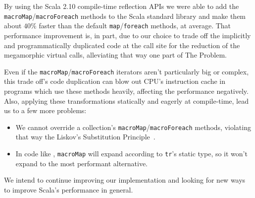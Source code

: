 \label{conclusions}

By using the Scala 2.10 compile-time reflection APIs we were able to add the \texttt{macroMap}/\texttt{macroForeach} methods to the Scala standard library and make them about $40\%$ faster than the default \texttt{map}/\texttt{foreach} methods, at average. That performance improvement is, in part, due to our choice to trade off the implicitly and programmatically duplicated code at the call site for the reduction of the megamorphic virtual calls, alleviating that way one part of The Problem.

Even if the \texttt{macroMap}/\texttt{macroForeach} iterators aren't particularly big or complex, this trade off's code duplication can blow out CPU's instruction cache in programs which use these methods heavily, affecting the performance negatively. Also, applying these transformations statically and eagerly at compile-time, lead us to a few more problems:

\begin{itemize}
 \item We cannot override a collection's \texttt{macroMap}/\texttt{macroForeach} methods, violating that way the Liskov's Substitution Principle~\cite{liskov1994behavioral}.
 \item In code like , \texttt{macroMap} will expand according to \texttt{tr}'s static type, so it won't expand to the most performant alternative.
\end{itemize}

We intend to continue improving our implementation and looking for new ways to improve Scala's performance in general.

